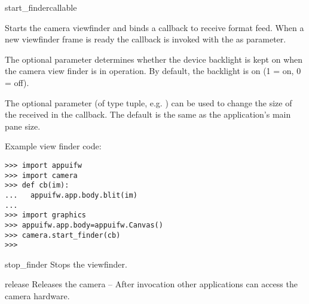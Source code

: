 \begin{funcdesc}{start_finder}{callable}

Starts the camera viewfinder and binds a callback to receive  format 
feed. When a new viewfinder frame is ready the callback is invoked with the 
 as parameter.

The optional parameter  determines whether the device 
backlight is kept on when the camera view finder is in operation. By default, 
the backlight is on (1 = on, 0 = off).

The optional parameter  (of type tuple, e.g. ) can 
be used to change the size of the  received in the callback. The 
default  is the same as the application's main pane size. 

Example view finder code:

\begin{verbatim}
>>> import appuifw
>>> import camera
>>> def cb(im):
...   appuifw.app.body.blit(im)
...
>>> import graphics
>>> appuifw.app.body=appuifw.Canvas()
>>> camera.start_finder(cb)
>>>
\end{verbatim}

\end{funcdesc}

\begin{funcdesc}{stop_finder}{}
Stops the viewfinder.
\end{funcdesc}

\begin{funcdesc}{release}{}
Releases the camera -- After invocation other applications can access the camera 
hardware.
\end{funcdesc}
